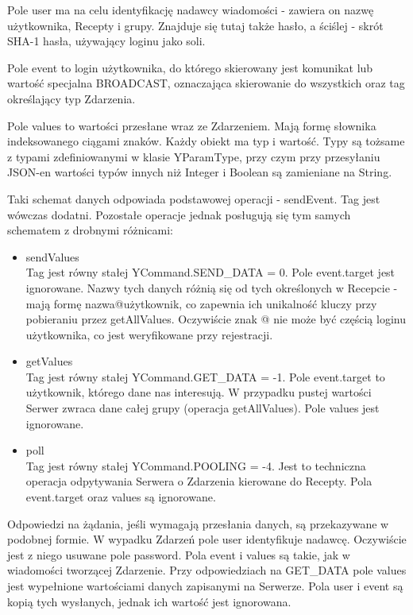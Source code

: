 \documentclass[11pt,a4paper,polish,thesis]{dcsbook}
\begin{document}
Pole user ma na celu identyfikację nadawcy wiadomości - zawiera on nazwę użytkownika, Recepty i grupy. Znajduje się tutaj także hasło, a ściślej - skrót SHA-1 hasła, używający loginu jako soli. 

Pole event to login użytkownika, do którego skierowany jest komunikat lub wartość specjalna BROADCAST, oznaczająca skierowanie do wszystkich oraz tag określający typ Zdarzenia.

Pole values to wartości przesłane wraz ze Zdarzeniem. Mają formę słownika indeksowanego ciągami znaków. Każdy obiekt ma typ i wartość. Typy są tożsame z typami zdefiniowanymi w klasie YParamType, przy czym przy przesyłaniu JSON-en wartości typów innych niż Integer i Boolean są zamieniane na String.

Taki schemat danych odpowiada podstawowej operacji - sendEvent. Tag jest wówczas dodatni.
Pozostałe operacje jednak posługują się tym samych schematem z drobnymi różnicami:
\begin{itemize}
\item{sendValues} \\
Tag jest równy stałej YCommand.SEND\_DATA = 0. Pole event.target jest ignorowane. Nazwy tych danych różnią się od tych określonych w Recepcie - mają formę nazwa@użytkownik, co zapewnia ich unikalność kluczy przy pobieraniu przez getAllValues. Oczywiście znak @ nie może być częścią loginu użytkownika, co jest weryfikowane przy rejestracji. 
 \item{getValues} \\
Tag jest równy stałej YCommand.GET\_DATA = -1. Pole event.target to użytkownik, którego dane nas interesują. W przypadku pustej wartości Serwer zwraca dane całej grupy (operacja getAllValues). Pole values jest ignorowane.
\item{poll} \\
Tag jest równy stałej YCommand.POOLING = -4. Jest to techniczna operacja odpytywania Serwera o Zdarzenia kierowane do Recepty. Pola event.target oraz values są ignorowane.
\end{itemize}
Odpowiedzi na żądania, jeśli wymagają przesłania danych, są przekazywane w podobnej formie.
W wypadku Zdarzeń pole user identyfikuje nadawcę. Oczywiście jest z niego usuwane pole password. Pola event i values są takie, jak w wiadomości tworzącej Zdarzenie. 
Przy odpowiedziach na GET\_DATA pole values jest wypełnione wartościami danych zapisanymi na Serwerze. Pola user i event są kopią tych wysłanych, jednak ich wartość jest ignorowana. 
\end{document}
